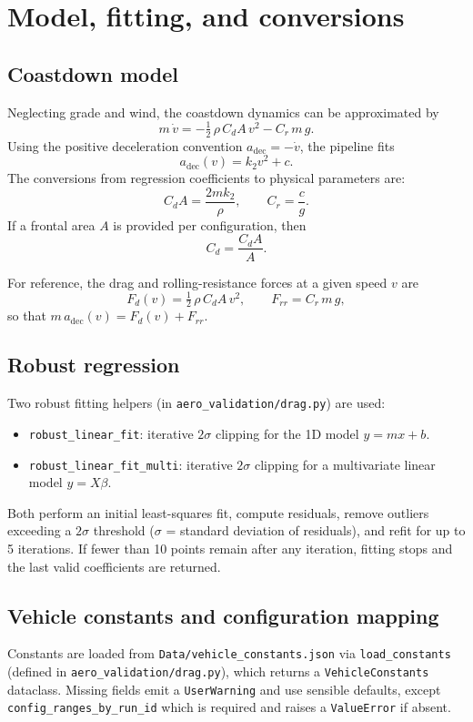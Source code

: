 \documentclass[11pt,a4paper]{article}
\begin{document}
\section{Model, fitting, and conversions}
\subsection*{Coastdown model}
Neglecting grade and wind, the coastdown dynamics can be approximated by
\[
  m\,\dot v = -\tfrac{1}{2}\,\rho\,C_dA\,v^2 - C_r\,m\,g.
\]
Using the positive deceleration convention \(a_\mathrm{dec}=-\dot v\), the pipeline fits
\[
  a_\mathrm{dec}(v) = k_2 v^2 + c.
\]
The conversions from regression coefficients to physical parameters are:
\[
  C_dA = \frac{2 m k_2}{\rho}, \qquad C_r = \frac{c}{g}.
\]
If a frontal area $A$ is provided per configuration, then
\[
  C_d = \frac{C_dA}{A}.
\]

For reference, the drag and rolling-resistance forces at a given speed $v$ are
\[
  F_d(v) = \tfrac{1}{2}\,\rho\,C_dA\,v^2, \qquad
  F_{rr} = C_r\,m\,g,
\]
so that $m\,a_\mathrm{dec}(v) = F_d(v) + F_{rr}$.

\subsection*{Robust regression}
Two robust fitting helpers (in \texttt{aero\_validation/drag.py}) are used:
\begin{itemize}
  \item \texttt{robust\_linear\_fit}: iterative $2\sigma$ clipping for the 1D model \(y=m x + b\).
  \item \texttt{robust\_linear\_fit\_multi}: iterative $2\sigma$ clipping for a multivariate linear model \(y=X\beta\).
\end{itemize}
Both perform an initial least-squares fit, compute residuals, remove outliers
exceeding a $2\sigma$ threshold ($\sigma$ = standard deviation of residuals),
and refit for up to 5 iterations.  If fewer than 10 points remain after any
iteration, fitting stops and the last valid coefficients are returned.

\subsection*{Vehicle constants and configuration mapping}
Constants are loaded from \texttt{Data/vehicle\_constants.json} via
\texttt{load\_constants} (defined in \texttt{aero\_validation/drag.py}), which
returns a \texttt{VehicleConstants} dataclass.  Missing fields emit a
\texttt{UserWarning} and use sensible defaults, except
\texttt{config\_ranges\_by\_run\_id} which is required and raises a
\texttt{ValueError} if absent.
\end{document}
